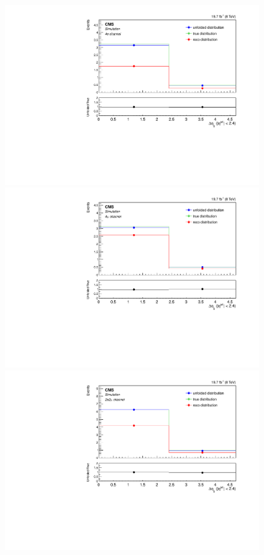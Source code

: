 \begin{figure}[hbtp]
\begin{center}
    \includegraphics[width=0.8\cmsFigWidth]{Figures/Unfolding/MCTests/CentralDeta_ZZTo4e_MadMatrix_MadDistr_HalfSample_fr}     
    \includegraphics[width=0.8\cmsFigWidth]{Figures/Unfolding/MCTests/CentralDeta_ZZTo4m_MadMatrix_MadDistr_HalfSample_fr}     
    \includegraphics[width=0.8\cmsFigWidth]{Figures/Unfolding/MCTests/CentralDeta_ZZTo2e2m_MadMatrix_MadDistr_HalfSample_fr}     

\end{center}
\end{figure}
